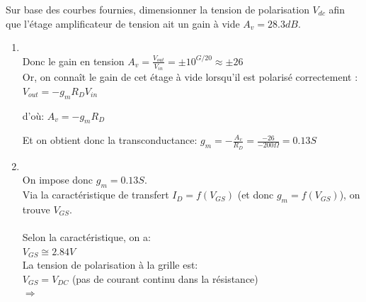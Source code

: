 \Question
{
Sur base des courbes fournies, dimensionner la tension de polarisation $V_{dc}$ afin que l'étage amplificateur de tension ait un gain à vide $A_v=28.3dB$. 

}
{%
\begin{enumerate}

	
	\item {}\\
	
	Donc le gain en tension $A_v=\frac{V_{out}}{V_{in}}=\pm 10^{G/20}\approx \pm26$\\
	
	Or, on connaît le gain de cet étage à vide lorsqu'il est polarisé correctement :
	$V_{out}=-g_m R_D V_{in}$ 	
	
	d'où:	$A_v=-g_m R_D$
	
	Et on obtient donc la transconductance:
	$g_m=-\frac{A_v}{R_D}=\frac{-26}{-200\Omega}=0.13 S$
	
	\item {}\\
	
	On impose donc $g_m=0.13S$.\\
	Via la caractéristique de transfert $I_D=f(V_{GS})$ (et donc $g_m=f(V_{GS})$), on trouve $V_{GS}$.\\
	~\\
Selon la caractéristique, on a:\\
	$V_{GS}\cong 2.84V$\\
		
La tension de polarisation à la grille est:\\
	$V_{GS}=V_{DC}$ (pas de courant continu dans la résistance)\\
	
%	
%	
	$\Rightarrow$ 
	
\end{enumerate}
}

